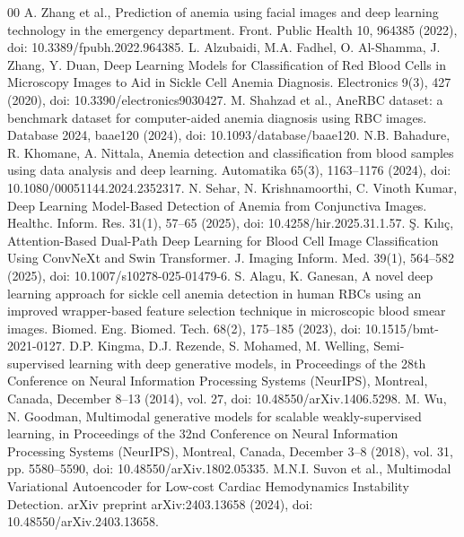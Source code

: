 \documentclass[conference]{IEEEtran}
\begin{document}
\FloatBarrier
\begin{thebibliography}{00}
 A. Zhang et al., Prediction of anemia using facial images and deep learning technology in the emergency department. Front. Public Health 10, 964385 (2022), doi: 10.3389/fpubh.2022.964385.
 L. Alzubaidi, M.A. Fadhel, O. Al-Shamma, J. Zhang, Y. Duan, Deep Learning Models for Classification of Red Blood Cells in Microscopy Images to Aid in Sickle Cell Anemia Diagnosis. Electronics 9(3), 427 (2020), doi: 10.3390/electronics9030427.
 M. Shahzad et al., AneRBC dataset: a benchmark dataset for computer-aided anemia diagnosis using RBC images. Database 2024, baae120 (2024), doi: 10.1093/database/baae120.
 N.B. Bahadure, R. Khomane, A. Nittala, Anemia detection and classification from blood samples using data analysis and deep learning. Automatika 65(3), 1163--1176 (2024), doi: 10.1080/00051144.2024.2352317.
 N. Sehar, N. Krishnamoorthi, C. Vinoth Kumar, Deep Learning Model-Based Detection of Anemia from Conjunctiva Images. Healthc. Inform. Res. 31(1), 57--65 (2025), doi: 10.4258/hir.2025.31.1.57.
 \c{S}. K{\i}l{\i}\c{c}, Attention-Based Dual-Path Deep Learning for Blood Cell Image Classification Using ConvNeXt and Swin Transformer. J. Imaging Inform. Med. 39(1), 564--582 (2025), doi: 10.1007/s10278-025-01479-6.
 S. Alagu, K. Ganesan, A novel deep learning approach for sickle cell anemia detection in human RBCs using an improved wrapper-based feature selection technique in microscopic blood smear images. Biomed. Eng. Biomed. Tech. 68(2), 175--185 (2023), doi: 10.1515/bmt-2021-0127.
 D.P. Kingma, D.J. Rezende, S. Mohamed, M. Welling, Semi-supervised learning with deep generative models, in Proceedings of the 28th Conference on Neural Information Processing Systems (NeurIPS), Montreal, Canada, December 8--13 (2014), vol. 27, doi: 10.48550/arXiv.1406.5298.
 M. Wu, N. Goodman, Multimodal generative models for scalable weakly-supervised learning, in Proceedings of the 32nd Conference on Neural Information Processing Systems (NeurIPS), Montreal, Canada, December 3--8 (2018), vol. 31, pp. 5580--5590, doi: 10.48550/arXiv.1802.05335.
 M.N.I. Suvon et al., Multimodal Variational Autoencoder for Low-cost Cardiac Hemodynamics Instability Detection. arXiv preprint arXiv:2403.13658 (2024), doi: 10.48550/arXiv.2403.13658.
\end{thebibliography}
\end{document}
